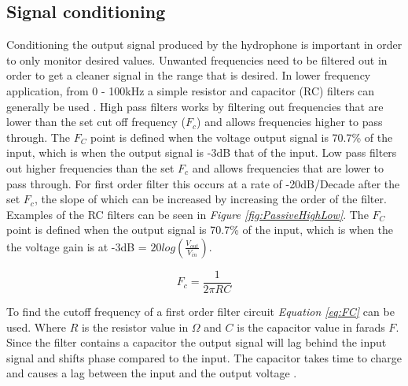 
\subsection{Signal conditioning}

Conditioning the output signal produced by the hydrophone is important in order to only monitor desired values.
Unwanted frequencies need to be filtered out in order to get a cleaner signal in the range that is desired.
In lower frequency application, from 0 - 100kHz a simple resistor and capacitor (RC) filters can generally be used \cite{noauthor_low_2013}.
High pass filters works by filtering out frequencies that are lower than the set cut off frequency ($F_c$) and allows frequencies higher to pass through.
The $F_C$ point is defined when the voltage output signal is 70.7\% of the input, which is when the output signal is -3dB that of the input.%
Low pass filters out higher frequencies than the set $F_c$ and allows frequencies that are lower to pass through. 
For first order filter this occurs at a rate of -20dB/Decade after the set $F_c$, the slope of which can be increased by increasing the order of the filter.
Examples of the RC filters can be seen in \textit{Figure \ref{fig:PassiveHighLow}}.
The $F_C$ point is defined when the output signal is 70.7\% of the input, which is when the the voltage gain is at -3dB = $20log(\frac{V_{out}}{V_{in}})$.

\begin{equation}
    F_c = \frac{1}{2\pi RC}
    \label{eq:FC}
\end{equation}

To find the cutoff frequency of a first order filter circuit \textit{Equation \ref{eq:FC}} can be used.
Where $R$ is the resistor value in $\Omega$ and $C$ is the capacitor value in farads $F$.
Since the filter contains a capacitor the output signal will lag behind the input signal and shifts phase compared to the input. 
The capacitor takes time to charge and causes a lag between the input and the output voltage \cite{noauthor_low_2013}. 

